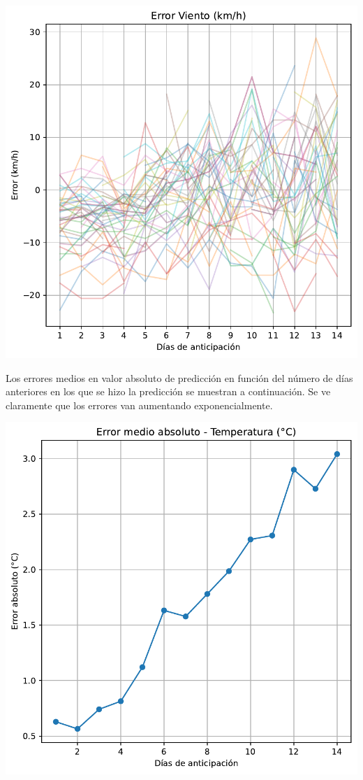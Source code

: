 \documentclass[
  10pt,
  a4paper,
  DIV=11,
  numbers=noendperiod,
  open=any]{scrreprt}
\makeatletter
\newcommand*\pandocbounded[1]{%
  \sbox\pandoc@box{#1}%
  \Gscale@div\@tempa{\textheight}{\dimexpr\ht\pandoc@box+\dp\pandoc@box\relax}%
  \Gscale@div\@tempb{\linewidth}{\wd\pandoc@box}%
  \ifdim\@tempb\p@<\@tempa\p@\let\@tempa\@tempb\fi%
  \ifdim\@tempa\p@<\p@\scalebox{\@tempa}{\usebox\pandoc@box}%
  \else\usebox{\pandoc@box}%
  \fi%
}
\numberwithin{equation}{chapter}
\numberwithin{equation}{section}
\renewcommand{\[}{\begin{equation}}
\renewcommand{\]}{\end{equation}}
\providecommand{\pandocbounded}[1]{#1}%
\renewcommand{\pandocbounded}[1]{\begingroup\centering #1\par\endgroup}
\makeatother
\begin{document}
\pandocbounded{\includegraphics[keepaspectratio]{03-meteorologia/predicciones_files/figure-pdf/cell-2-output-4.pdf}}

Los errores medios en valor absoluto de predicción en función del número
de días anteriores en los que se hizo la predicción se muestran a
continuación. Se ve claramente que los errores van aumentando
exponencialmente.

\pandocbounded{\includegraphics[keepaspectratio]{03-meteorologia/predicciones_files/figure-pdf/cell-3-output-1.pdf}}
\end{document}
